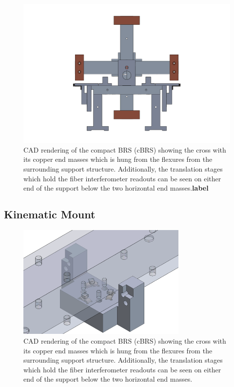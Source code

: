 \documentclass [12pt, proquest]{uwthesis}[2019]
\begin{document}
\begin{figure}[!h]
\begin{center}
 \includegraphics[width=\textwidth]{cBRSFront.png}
 
\caption[Side view of the CAD rendering of the cBRS]{CAD rendering of the compact BRS (cBRS) showing the cross with its copper end masses which is hung from the flexures from the surrounding support structure. Additionally, the translation stages which hold the fiber interferometer readouts can be seen on either end of the support below the two horizontal end masses.\textbf{label}}
\label{cBRS2}
\end{center}
\end{figure}

\subsection{Kinematic Mount}

\begin{figure}[!h]
\begin{center}
\includegraphics[width=0.75\textwidth]{cBRSKMount.png}
\end{center}
\caption[CAD rendering of the cBRS kinematic mount]{CAD rendering of the compact BRS (cBRS) showing the cross with its copper end masses which is hung from the flexures from the surrounding support structure. Additionally, the translation stages which hold the fiber interferometer readouts can be seen on either end of the support below the two horizontal end masses.}
\end{figure}
\end{document}
